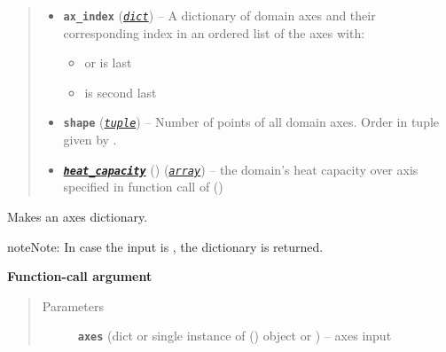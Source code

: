 \documentclass[a4paper,10pt,english]{sphinxmanual}
\begin{document}
\begin{fulllineitems}
\begin{quote}
\begin{description}
\begin{itemize}
\item {} 
\textbf{\texttt{ax\_index}} (\href{http://docs.python.org/2.7/library/stdtypes.html\#dict}{\emph{\texttt{dict}}}) -- 
A dictionary of domain axes and their corresponding index
in an ordered list of the axes with:
\begin{itemize}
\item {} 
 or  is last

\item {} 
 is second last

\end{itemize}


\item {} 
\textbf{\texttt{shape}} (\href{http://docs.python.org/2.7/library/functions.html\#tuple}{\emph{\texttt{tuple}}}) -- Number of points of all domain axes. Order in 
tuple given by .

\item {} 
{\hyperref[api/climlab.utils:module\string-climlab.utils.heat_capacity]{\emph{\textbf{\texttt{heat\_capacity}}}}} () (\href{http://docs.python.org/2.7/library/array.html\#module-array}{\emph{\texttt{array}}}) -- the domain's heat capacity over axis specified 
in function call of {\hyperref[api/climlab.domain:climlab.domain.domain._Domain.set_heat_capacity]{\emph{}}} ()

\end{itemize}

\end{description}\end{quote}

\begin{fulllineitems}
\label{api/climlab.domain:climlab.domain.domain._Domain._make_axes_dict}
Makes an axes dictionary.

\begin{notice}{note}{Note:}
In case the input is , the dictionary 
is returned.
\end{notice}

\textbf{Function-call argument}
\begin{quote}\begin{description}
\item[{Parameters}] \leavevmode
\textbf{\texttt{axes}} (dict or single instance of 
{\hyperref[api/climlab.domain:climlab.domain.axis.Axis]{\emph{}}} () object or ) -- axes input


\end{description}
\end{quote}
\end{fulllineitems}
\end{fulllineitems}
\end{document}

